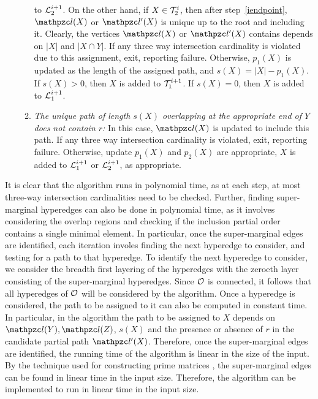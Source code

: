 \begin{enumerate}[I.]
\begin{enumerate}
    to ${\cal L}_2^{i+1}$.  On the other hand, if $X \in {\cal T}_2^i$, then
    after step~\ref{iendpoint}, $\cl(X)$ or $\cl'(X)$ is unique up to
    the root and including it. Clearly, the vertices $\cl(X)$ or
    $\cl'(X)$ contains depends on $|X|$ and $|X \cap Y|$.  If any
    three way intersection cardinality is violated due to this
    assignment, exit, reporting failure.  Otherwise,
    $p_1(X)$ is updated as the length of the assigned path, and $s(X)
    = |X|-p_1(X)$.  If $s(X) > 0$, then $X$ is added to ${\cal T}_1^{i+1}$.
    If $s(X)=0$, then $X$ is added to ${\cal L}_1^{i+1}$.
  \item {\em The unique path of length $s(X)$ overlapping at the
      appropriate end of $Y$ does not contain $r$:} In this case,
    $\cl(X)$ is updated to include this path.  If any three way
    intersection cardinality is violated, exit, reporting failure.
    Otherwise, update $p_1(X)$ and $p_2(X)$ are appropriate, $X$ is
    added to ${\cal L}_1^{i+1}$ or ${\cal L}_2^{i+1}$, as appropriate.
  \end{enumerate}
\end{enumerate}

 It
is clear that the algorithm runs in polynomial time, as at each step,
at most three-way intersection cardinalities need to be checked.
Further, finding super-marginal hyperedges can also be done in
polynomial time, as it involves considering the overlap regions and
checking if the inclusion partial order contains a single minimal
element.  In particular, once the super-marginal edges are identified,
each iteration involes finding the next hyperedge to consider, and
testing for a path to that hyperedge.  To identify the next hyperedge
to consider, we consider the breadth first layering of the hyperedges
with the zeroeth layer consisting of the super-marginal hyperedges.
Since ${\cal O}$ is connected, it follows that all hyperedges of ${\cal O}$ will
be considered by the algorithm.  Once a hyperedge is considered, the
path to be assigned to it can also be computed in constant time.  In
particular, in the algorithm the path to be assigned to $X$ depends on
$\cl(Y), \cl(Z)$, $s(X)$ and the presence or absence of $r$ in the
candidate partial path $\cl'(X)$.  Therefore, once the super-marginal
edges are identified, the running time of the algorithm is linear in
the size of the input.  By the technique used for constructing prime
matrices \cite{wlh02}, the super-marginal edges can be found in linear
time in the input size.  Therefore, the algorithm can be implemented
to run in linear time in the input size.

